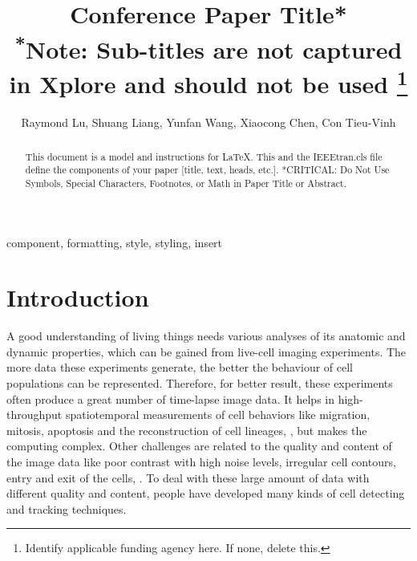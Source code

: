 \documentclass[conference]{IEEEtran}
\begin{document}
\title{Conference Paper Title*\\
{\footnotesize \textsuperscript{*}Note: Sub-titles are not captured in Xplore and
should not be used}
\thanks{Identify applicable funding agency here. If none, delete this.}
}

\author{Raymond Lu, Shuang Liang, Yunfan Wang, Xiaocong Chen, Con Tieu-Vinh}

\maketitle

\begin{abstract}
This document is a model and instructions for \LaTeX.
This and the IEEEtran.cls file define the components of your paper [title, text, heads, etc.]. *CRITICAL: Do Not Use Symbols, Special Characters, Footnotes, 
or Math in Paper Title or Abstract.
\end{abstract}

\begin{IEEEkeywords}
component, formatting, style, styling, insert
\end{IEEEkeywords}


\section{Introduction}


A good understanding of living things needs various analyses of its anatomic and dynamic properties, which can be gained from live-cell imaging experiments\cite{b1}. The more data these experiments generate, the better the behaviour of cell populations can be represented. Therefore, for better result, these experiments often produce a great number of time-lapse image data. It helps in high-throughput spatiotemporal measurements of cell behaviors like migration, mitosis, apoptosis and the reconstruction of cell lineages\cite{b2}, \cite{b3}, but makes the computing complex. Other challenges are related to the quality and content of the image data like poor contrast with high noise levels, irregular cell contours, entry and exit of the cells\cite{b3}, \cite{b4}. To deal with these large amount of data with different quality and content, people have developed many kinds of cell detecting and tracking techniques. \par
\end{document}
